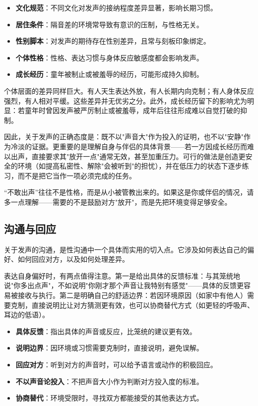 \documentclass[12pt,UTF8]{ctexbook}
\newcommand{\keyword}[1]{\textbf{#1}}
\begin{document}
\begin{itemize}
  \item \keyword{文化规范}：不同文化对发声的接纳程度差异显著，影响长期习惯。
  \item \keyword{居住条件}：隔音差的环境常导致有意识的压制，与性格无关。
  \item \keyword{性别脚本}：对发声的期待存在性别差异，且常与刻板印象绑定。
  \item \keyword{个体性格}：性格、表达习惯与身体反应敏感度都会影响发声。
  \item \keyword{成长经历}：童年被制止或被羞辱的经历，可能形成持久抑制。
\end{itemize}

个体层面的差异同样巨大。有人天生表达外放，有人长期内向克制；有人身体反应强烈，有人相对平缓。这些差异并无优劣之分。此外，成长经历留下的影响尤为明显：若童年时曾因发声被严厉制止或被羞辱，成年后往往形成难以自觉打破的抑制。

因此，关于发声的正确态度是：既不以"声音大"作为投入的证明，也不以"安静"作为冷淡的证据。更重要的是理解自身与伴侣的具体背景——若一方因成长经历而难以出声，直接要求其"放开一点"通常无效，甚至加重压力。可行的做法是创造更安全的环境（如提高私密性、解除"会被听到"的担忧），并在低压力的状态下逐步练习，而不是把它当作一项必须完成的任务。

\begin{tcolorbox}[colback=pink!5!white,colframe=red!50!black,title=贴心小叮咛]
“不敢出声”往往不是性格，而是从小被管教出来的。如果这是你或伴侣的情况，请多一点理解——需要的不是鼓励对方"放开"，而是先把环境变得足够安全。
\end{tcolorbox}
\subsection{沟通与回应}

关于发声的沟通，是性沟通中一个具体而实用的切入点。它涉及如何表达自己的偏好、如何回应对方，以及如何处理差异。

表达自身偏好时，有两点值得注意。第一是给出具体的反馈标准：与其笼统地说"你多出点声"，不如说明"你刚才那个声音让我特别有感觉"——具体的反馈更容易被接收与执行。第二是明确自己的舒适边界：若因环境原因（如家中有他人）需要克制，直接说明比让对方猜测更有效，也可以协商替代方式（如更轻的呼吸声、耳边的低语）。

\begin{itemize}
  \item \keyword{具体反馈}：指出具体的声音或反应，比笼统的建议更有效。
  \item \keyword{说明边界}：因环境或习惯需要克制时，直接说明，避免误解。
  \item \keyword{回应对方}：听到对方的声音时，可以给予语言或动作的积极回应。
  \item \keyword{不以声音论投入}：不把声音大小作为判断对方投入度的标准。
  \item \keyword{协商替代}：环境受限时，寻找双方都能接受的其他表达方式。
\end{itemize}
\end{document}
